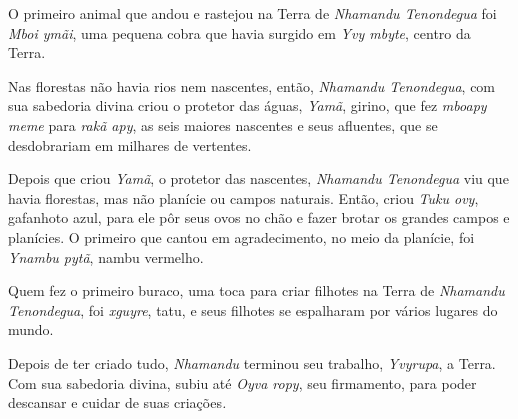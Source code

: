 
O primeiro animal que andou e rastejou na Terra de \emph{Nhamandu
Tenondegua} foi \emph{Mboi ymãi}, uma pequena cobra que havia surgido em
\emph{Yvy mbyte}, centro da Terra.

Nas florestas não havia rios nem nascentes, então, \emph{Nhamandu
Tenondegua}, com sua sabedoria divina criou o protetor das águas,
\emph{Yamã}, girino, que fez \emph{mboapy meme} para \emph{rakã apy}, as
seis maiores nascentes e seus afluentes, que se desdobrariam em milhares
de vertentes.


Depois que criou \emph{Yamã}, o protetor das nascentes, \emph{Nhamandu
Tenondegua} viu que havia florestas, mas não planície ou campos
naturais. Então, criou \emph{Tuku ovy}, gafanhoto azul, para ele pôr
seus ovos no chão e fazer brotar os grandes campos e planícies. O primeiro que cantou em agradecimento, no meio da planície, foi
\emph{Ynambu pytã}, nambu vermelho.


 

Quem fez o primeiro buraco, uma toca para criar filhotes na Terra de
\emph{Nhamandu Tenondegua}, foi \emph{xguyre}, tatu, e seus filhotes se
espalharam por vários lugares do mundo.

Depois de ter criado tudo, \emph{Nhamandu} terminou seu trabalho,
\emph{Yvyrupa}, a Terra. Com sua sabedoria divina, subiu até \emph{Oyva
ropy}, seu firmamento, para poder descansar e cuidar de suas
criações\emph{.}

 

 
